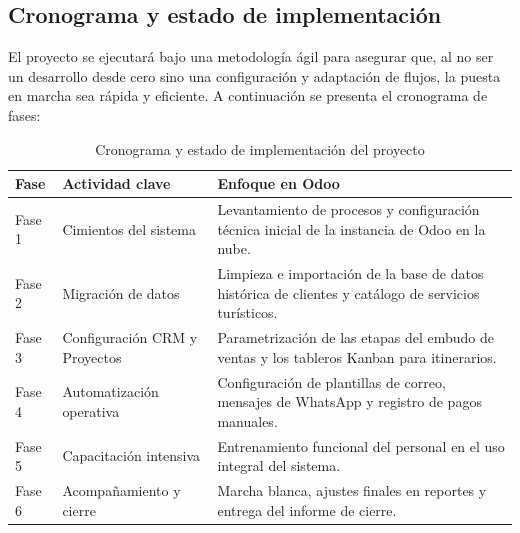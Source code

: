 \subsection{Cronograma y estado de implementación}

\begin{indentedsubsection}
El proyecto se ejecutará bajo una metodología ágil para asegurar que, al no ser un desarrollo desde cero sino una configuración y adaptación de flujos, la puesta en marcha sea rápida y eficiente. A continuación se presenta el cronograma de fases:

\begin{table}[h]
    \centering
    \begin{tabularx}{\textwidth}{|l|l|X|}
        \hline
        \textbf{Fase} & \textbf{Actividad clave} & \textbf{Enfoque en Odoo} \\
        \hline
        Fase 1 & Cimientos del sistema & Levantamiento de procesos y configuración técnica inicial de la instancia de Odoo en la nube. \\
        \hline
        Fase 2 & Migración de datos & Limpieza e importación de la base de datos histórica de clientes y catálogo de servicios turísticos. \\
        \hline
        Fase 3 & Configuración CRM y Proyectos & Parametrización de las etapas del embudo de ventas y los tableros Kanban para itinerarios. \\
        \hline
        Fase 4 & Automatización operativa & Configuración de plantillas de correo, mensajes de WhatsApp y registro de pagos manuales. \\
        \hline
        Fase 5 & Capacitación intensiva & Entrenamiento funcional del personal en el uso integral del sistema. \\
        \hline
        Fase 6 & Acompañamiento y cierre & Marcha blanca, ajustes finales en reportes y entrega del informe de cierre. \\
        \hline
    \end{tabularx}
    \caption{Cronograma y estado de implementación del proyecto}
\end{table}

\end{indentedsubsection}

